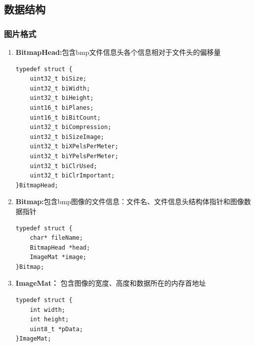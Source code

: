 \documentclass[12pt, a4paper, oneside]{ctexbook}
\begin{document}
		\subsection{数据结构}
		\subsubsection{图片格式}
		\begin{enumerate}
			\item \textbf{BitmapHead:}包含bmp文件信息头各个信息相对于文件头的偏移量
			\begin{lstlisting}
typedef struct {
	uint32_t biSize;
	uint32_t biWidth;
	uint32_t biHeight;
	uint16_t biPlanes;
	uint16_t biBitCount;
	uint32_t biCompression;
	uint32_t biSizeImage;
	uint32_t biXPelsPerMeter;
	uint32_t biYPelsPerMeter;
	uint32_t biClrUsed;
	uint32_t biClrImportant;
}BitmapHead;
			\end{lstlisting}
			
			
			\item \textbf{Bitmap:}包含bmp图像的文件信息：文件名、文件信息头结构体指针和图像数据指针
			\begin{lstlisting}
typedef struct {
	char* fileName;
	BitmapHead *head;
	ImageMat *image;
}Bitmap;
			\end{lstlisting}
			
			
			\item \textbf{ImageMat：} 包含图像的宽度、高度和数据所在的内存首地址
			\begin{lstlisting}[numbers=none]
typedef struct {
	int width;
	int height;
	uint8_t *pData;
}ImageMat;		
			\end{lstlisting}			
		\end{enumerate}
		
\end{document}
